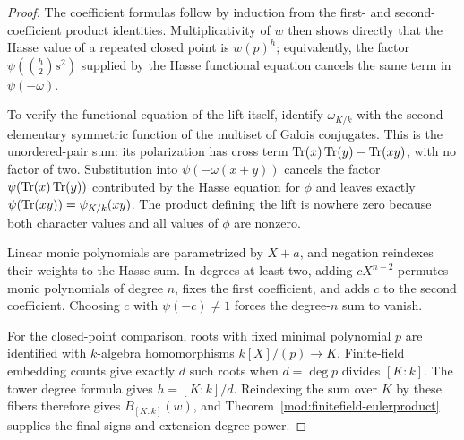 \begin{proof}
The coefficient formulas follow by induction from the first- and
second-coefficient product identities.  Multiplicativity of $w$ then
shows directly that the Hasse value of a repeated closed point is
$w(p)^h$; equivalently, the factor
$\psi(\binom h2s^2)$ supplied by the Hasse functional equation cancels
the same term in $\psi(-\omega)$.

To verify the functional equation of the lift itself, identify
$\omega_{K/k}$ with the second elementary symmetric function of the
multiset of Galois conjugates.  This is the unordered-pair sum: its
polarization has cross term
$\operatorname{Tr}(x)\operatorname{Tr}(y)-\operatorname{Tr}(xy)$, with no factor of two.  Substitution into
$\psi(-\omega(x+y))$ cancels the factor
$\psi(\operatorname{Tr}(x)\operatorname{Tr}(y))$ contributed by the Hasse equation for $\phi$ and
leaves exactly $\psi(\operatorname{Tr}(xy))=\psi_{K/k}(xy)$.  The product defining the
lift is nowhere zero because both character values and all values of
$\phi$ are nonzero.

Linear monic polynomials are parametrized by $X+a$, and negation
reindexes their weights to the Hasse sum.  In degrees at least two,
adding $cX^{n-2}$ permutes monic polynomials of degree $n$, fixes the
first coefficient, and adds $c$ to the second coefficient.  Choosing
$c$ with $\psi(-c)\ne1$ forces the degree-$n$ sum to vanish.

For the closed-point comparison, roots with fixed minimal polynomial
$p$ are identified with $k$-algebra homomorphisms $k[X]/(p)\to K$.
Finite-field embedding counts give exactly $d$ such roots when
$d=\deg p$ divides $[K:k]$.  The tower degree formula gives
$h=[K:k]/d$.  Reindexing the sum over $K$ by these fibers therefore
gives $B_{[K:k]}(w)$, and
Theorem~\ref{mod:finitefield-eulerproduct} supplies the final signs and
extension-degree power.
\end{proof}
